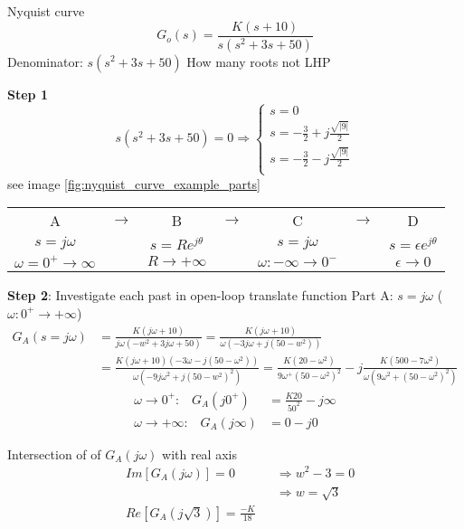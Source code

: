 \begin{exampleblock}{Nyquist curve}
    \begin{equation*}
        G_o(s) = \frac{K(s+10)}{s(s^2+3s+50)}
    \end{equation*}
    Denominator: $s(s^2 + 3s + 50)$
    How many roots not LHP

    \textbf{Step 1}
    \begin{equation*}
        s(s^2+3s+50) = 0 \Rightarrow 
        \begin{cases}
            s = 0 \\
            s = -\frac{3}{2} + j\frac{\sqrt{|9|}}{2} \\
            s = -\frac{3}{2} - j\frac{\sqrt{|9|}}{2} \\
        \end{cases}
    \end{equation*}
    see image \ref{fig:nyquist_curve_example_parts}

    \begin{tabular}{ c c c c c c c }
        A  &  $\rightarrow$  &  B  &  $\rightarrow$  &  C  &  $\rightarrow$ & D \\
        $s=j\omega$  &  &  $s=Re^{j\theta}$  &  &  $s=j\omega$  &  &  $s=\epsilon e^{j\theta}$ \\
        $\omega=0^{+}\to\infty$  &  &  $R\to+\infty$  &  &  $\omega:-\infty\to0^{-}$  &  &  $\epsilon\to0$ \\
    \end{tabular}

    \textbf{Step 2}: Investigate each past in open-loop translate function \newline
    Part A: $s=j\omega$ ($\omega:0^{+}\to+\infty$)
    \begin{align*}
        G_A(s=j\omega) &= \frac{K(j\omega + 10)}{j\omega(-w^2+3j\omega+50)}
        = \frac{K(j\omega + 10)}{\omega(-3j\omega+j(50-w^2))} \\
        &= \frac{K(j\omega + 10)(-3\omega - j(50-\omega^2))}{\omega(-9j\omega^2+j(50-w^2)^2)} 
        = \frac{K(20-\omega^2)}{9\omega^ + (50-\omega^2)^2} - j\frac{K(500-7\omega^2)}{\omega(9\omega^2+(50-\omega^2)^2)}
    \end{align*}
    \begin{align*}
        \omega\to0^+: \;\;\; G_A(j0^+) &= \frac{K20}{50^2} - j\infty  \\
        \omega\to+\infty: \;\;\; G_A(j\infty) &= 0 - j0
    \end{align*}

    Intersection of of $G_A(j\omega)$ with real axis 
    \begin{align*}
        &Im[G_A(j\omega)] = 0 & &\Rightarrow w^2 -3 = 0 \\
        & & &\Rightarrow w = \sqrt{3} \\
        &Re[G_A(j\sqrt{3})] = \frac{-K}{18}
    \end{align*}


\end{exampleblock}
